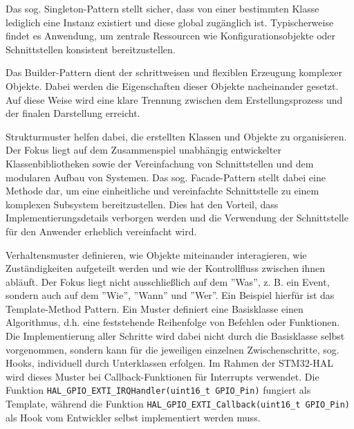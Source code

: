 Das sog. Singleton-Pattern stellt sicher, dass von einer bestimmten Klasse lediglich eine Instanz existiert und diese global zugänglich ist. 
Typischerweise findet es Anwendung, um zentrale Ressourcen wie Konfigurationsobjekte oder Schnittstellen konsistent bereitzustellen.

Das Builder-Pattern dient der schrittweisen und flexiblen Erzeugung komplexer Objekte.
Dabei werden die Eigenschaften dieser Objekte nacheinander gesetzt. 
Auf diese Weise wird eine klare Trennung zwischen dem Erstellungsprozess und der finalen Darstellung erreicht.

Strukturmuster helfen dabei, die erstellten Klassen und Objekte zu organisieren.
Der Fokus liegt auf dem Zusammenspiel unabhängig entwickelter Klassenbibliotheken sowie der Vereinfachung von Schnittstellen und dem modularen Aufbau von Systemen.
Das sog. Facade-Pattern stellt dabei eine Methode dar, um eine einheitliche und vereinfachte Schnittstelle zu einem komplexen Subsystem bereitzustellen. 
Dies hat den Vorteil, dass Implementierungsdetails verborgen werden und die Verwendung der Schnittstelle für den Anwender erheblich vereinfacht wird.

Verhaltensmuster definieren, wie Objekte miteinander interagieren, wie Zuständigkeiten aufgeteilt werden und wie der Kontrollfluss zwischen ihnen abläuft.
Der Fokus liegt nicht ausschließlich auf dem ''Was'', z. B. ein Event, sondern auch auf dem ''Wie'', ''Wann'' und ''Wer''.
Ein Beispiel hierfür ist das Template-Method Pattern. 
Ein Muster definiert eine Basisklasse einen Algorithmus, d.h. eine feststehende Reihenfolge von Befehlen oder Funktionen. 
Die Implementierung aller Schritte wird dabei nicht durch die Basisklasse selbst vorgenommen, sondern kann für die jeweiligen einzelnen Zwischenschritte, sog. Hooks, individuell durch Unterklassen erfolgen.
Im Rahmen der STM32-HAL wird dieses Muster bei Callback-Funktionen für Interrupts verwendet. 
Die Funktion \texttt{HAL\_GPIO\_EXTI\_IRQHandler(uint16\_t GPIO\_Pin)} fungiert als Template, während die Funktion \texttt{HAL\_GPIO\_EXTI\_Callback(uint16\_t GPIO\_Pin)} als Hook vom Entwickler selbst implementiert werden muss.

